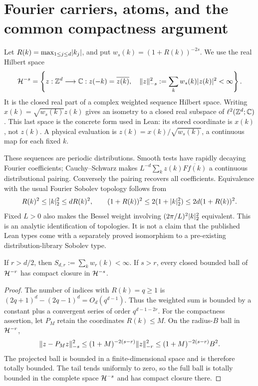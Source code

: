 \section{Fourier carriers, atoms, and the common compactness argument}\label{sec:carrier}
Let $R(k)=\max_{1\leq j\leq d}\lvert k_j\rvert$, and put
$w_s(k)=(1+R(k))^{-2s}$. We use the real Hilbert space
\[
 \mathcal H^{-s}=\left\{z:\mathbb Z^d\longrightarrow\mathbb C:
 z(-k)=\overline{z(k)},\quad
 \lVert z\rVert_{-s}^2:=\sum_kw_s(k)\lvert z(k)\rvert^2<\infty\right\}.
\]
It is the closed real part of a complex weighted sequence Hilbert space.
Writing $x(k)=\sqrt{w_s(k)}z(k)$ gives an isometry to a closed real subspace
of $\ell^2(\mathbb Z^d;\mathbb C)$. This last space is the concrete form used in Lean:
its stored coordinate is $x(k)$, not $z(k)$. A physical evaluation is
$z(k)=x(k)/\sqrt{w_s(k)}$, a continuous map for each fixed $k$.

These sequences are periodic distributions. Smooth tests have rapidly
decaying Fourier coefficients; Cauchy--Schwarz makes
$L^{-d}\sum_kz(k)\overline{Ff(k)}$ a continuous distributional pairing.
Conversely the pairing recovers all coefficients. Equivalence with the usual
Fourier Sobolev topology follows from
\[
 R(k)^2\leq\lvert k\rvert_2^2\leq dR(k)^2,\qquad
 (1+R(k))^2\leq2(1+\lvert k\rvert_2^2)
 \leq2d(1+R(k))^2.
\]
Fixed $L>0$ also makes the Bessel weight involving $(2\pi/L)^2\lvert k\rvert_2^2$
equivalent. This is an analytic identification of topologies. It is not a
claim that the published Lean types come with a separately proved isomorphism
to a pre-existing distribution-library Sobolev type.

\begin{lemma}\label{lem:compact}
If $r>d/2$, then $S_{d,r}:=\sum_kw_r(k)<\infty$.
If $s>r$, every closed bounded ball of $\mathcal H^{-r}$ has compact closure in
$\mathcal H^{-s}$.
\end{lemma}
\begin{proof}
The number of indices with $R(k)=q\geq1$ is
$(2q+1)^d-(2q-1)^d=O_d(q^{d-1})$. Thus the weighted sum is bounded by a
constant plus a convergent series of order $q^{d-1-2r}$.
For the compactness assertion, let $P_M$ retain the coordinates $R(k)\leq M$.
On the radius-$B$ ball in $\mathcal H^{-r}$,
\begin{equation}\label{eq:tail}
 \lVert z-P_Mz\rVert_{-s}^2
 \leq(1+M)^{-2(s-r)}\lVert z\rVert_{-r}^2
 \leq(1+M)^{-2(s-r)}B^2.
\end{equation}
The projected ball is bounded in a finite-dimensional space and is therefore
totally bounded. The tail tends uniformly to zero, so the full ball is totally
bounded in the complete space $\mathcal H^{-s}$ and has compact closure there.
\end{proof}

